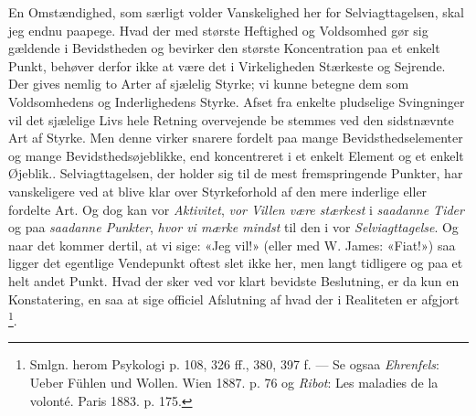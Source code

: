 \documentclass[12pt,a4paper,openany]{book}
\newcommand{\opage}[1]{\marginnote{\footnotesize\textit{[#1]}}}
\begin{document}
En Omstændighed, som særligt volder Vanskelighed her for Selviagttagelsen, skal
jeg endnu paapege. Hvad der med største Heftighed og Voldsomhed gør sig
gældende i Bevidstheden og bevirker den største Koncentration paa et enkelt
Punkt, behøver derfor ikke at være det i Virkeligheden Stærkeste og Sejrende.
Der gives nemlig to Arter af sjælelig Styrke; vi kunne betegne dem som
Voldsomhedens og Inderlighedens Styrke. Afset fra enkelte pludselige
Svingninger vil det sjælelige Livs hele Retning overvejende be%
\setcounter{footnote}{0}%
\opage{75}stemmes ved den sidstnævnte Art af Styrke. Men denne virker snarere
fordelt paa mange Bevidsthedselementer og mange Bevidsthedsøjeblikke, end
koncentreret i et enkelt Element og et enkelt Øjeblik.. Selviagttagelsen, der
holder sig til de mest fremspringende Punkter, har vanskeligere ved at blive
klar over Styrkeforhold af den mere inderlige eller fordelte Art. Og dog kan
vor \emph{Aktivitet}, \emph{vor Villen være stærkest} i \emph{saadanne Tider}
og paa \emph{saadanne Punkter}, \emph{hvor vi mærke mindst} til den i vor
\emph{Selviagttagelse}. Og naar det kommer dertil, at vi sige: «Jeg vil!»
(eller med W. James: «Fiat!») saa ligger det egentlige Vendepunkt oftest slet
ikke her, men langt tidligere og paa et helt andet Punkt. Hvad der sker ved vor
klart bevidste Beslutning, er da kun en Konstatering, en saa at sige officiel
Afslutning af hvad der i Realiteten er afgjort%
\footnote[1]{Smlgn. herom Psykologi p. 108, 326 ff., 380, 397 f. --- Se ogsaa
\emph{Ehrenfels}: Ueber Fühlen und Wollen. Wien 1887. p. 76 og \emph{Ribot}:
Les maladies de la volonté. Paris 1883. p. 175.}.
\end{document}
